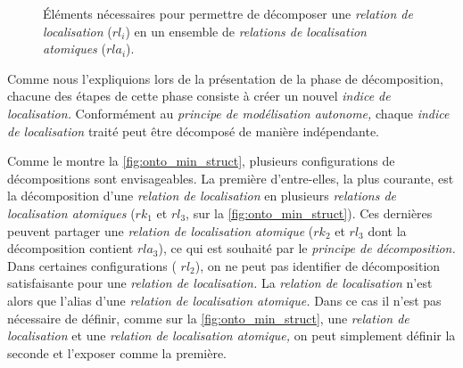 \begin{figure}
  \centering
   
  \caption{Éléments nécessaires pour permettre de décomposer une
    \emph{relation de localisation} ($rl_i$) en un ensemble de
    \emph{relations de localisation atomiques} ($rla_i$).}
  \label{fig:onto_min_struct}
\end{figure}

Comme nous l'expliquions lors de la présentation de la phase de
décomposition, chacune des étapes de cette phase consiste à créer un
nouvel \emph{indice de localisation.} Conformément au \emph{principe
  de modélisation autonome,} chaque \emph{indice de localisation}
traité peut être décomposé de manière indépendante.

Comme le montre la \autoref{fig:onto_min_struct}, plusieurs
configurations de décompositions sont envisageables. La première
d'entre-elles, la plus courante, est la décomposition d'une
\emph{relation de localisation} en plusieurs \emph{relations de
  localisation atomiques} (\eg \(rk_1\) et \(rl_3\), sur la
\autoref{fig:onto_min_struct}). Ces dernières peuvent partager une
\emph{relation de localisation atomique} (\eg \(rk_2\) et \(rl_3\)
dont la décomposition contient \(rla_3\)), ce qui est souhaité par le
\emph{principe de décomposition.} Dans certaines configurations (\eg
\(rl_2\)), on ne peut pas identifier de décomposition satisfaisante
pour une \emph{relation de localisation.} La \emph{relation de
  localisation} n'est alors que l'alias d'une \emph{relation de
  localisation atomique.} Dans ce cas il n'est pas nécessaire de
définir, comme sur la \autoref{fig:onto_min_struct}, une
\emph{relation de localisation} et une \emph{relation de localisation
  atomique,} on peut simplement définir la seconde et l'exposer comme
la première.


